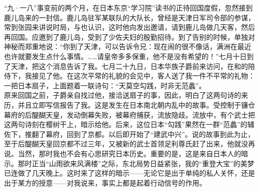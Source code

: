 “九·一八”事变前的两个月，在日本东京“学习院”读书的正待回国度假，忽然接到鹿儿岛来的一封信。鹿儿岛驻军某联队的大队长，曾经是天津日军司令部的参谋，常到张园来讲说时局，与也认识，这时他向发出邀请，请到鹿儿岛做几天客，然后再回国。应邀到了鹿儿岛，受到了少佐夫妇的殷勤招待。到了告别的时候，单独对神秘而郑重地说：“你到了天津，可以告诉令兄：现在闹的很不像话，满洲在最近也许就要发生点什么事情。……请皇帝多多保重，他不是没有希望的！”七月十日到了天津，把这个消息告诉了我。七月二十九日，日本华族子爵前来访问，在和的陪侍下，我接见了他。在这次平常的礼貌的会见中，客人送了我一件不平常的礼物：一把日本扇子，上面题着一联诗句：“天莫空勾践，时非无范蠡”。\\

原来回国之前，子爵亲自找过他，接洽送扇子的事，因此，明白了这两句诗的来历，并且立即写信报告了我。这是发生在日本南北朝内乱中的故事。受控制于镰仓幕府的后醍醐天皇，发动倒幕失败，被幕府捕获，流放隐歧。流放中，有个武士把这两句诗刻在樱树干上，暗示给他。后来，这位日本“勾践”果然在一群“范蠡”的辅佐下，推翻了幕府，回到了京都。以后即开始了“建武中兴”。说的故事到此为止，至于后醍醐天皇回京都不过三年，又被新的武士首领足利尊氏赶了出来，他就没再说。当然，那时我也不会有心思研究日本历史。重要的是，这是来自日本人的暗示。那时正当“山雨欲来风满楼”之际，东北局势日益紧张，我的“重登大宝”的美梦已连做了几天晚上。这时来了这样的暗示——无论它是出于单纯的私人关怀，还是出于某方的授意——对我说来，事实上都是起着行动信号的作用。\\

